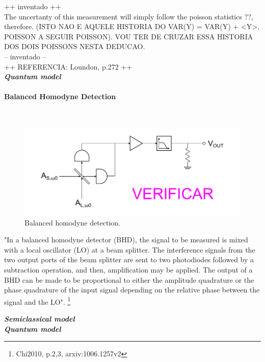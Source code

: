 \begin{bibunit}[plain]
++ inventado ++\\
The uncertanty of this measurement will simply follow the poisson statistics ??, therefore. (ISTO NAO E AQUELE HISTORIA DO VAR(Y) = VAR(Y) + <Y>, POISSON A SEGUIR POISSON). VOU TER DE CRUZAR ESSA HISTORIA DOS DOIS POISSONS NESTA DEDUCAO.\\
-- inventado --\\


++ REFERENCIA: Loundon, p.272 ++\\



{\bf \em Quantum model}\\


\paragraph{Balanced Homodyne Detection}\ \\
\begin{figure}[H]
	\centering
	\includegraphics{./sdf/optical_detection/figures/detection-balanced-homodyne.pdf}
	\caption{Balanced homodyne detection.}
\end{figure}
"In a balanced homodyne detector (BHD), the signal to be measured is mixed with a local oscillator (LO) at a beam splitter. The interference signals from the two output ports of the beam splitter are sent to two photodiodes followed by a subtraction operation, and then, amplification may be applied. The output of a BHD can be made to be proportional to either the amplitude quadrature or the phase quadrature of the input signal depending on the relative phase between the signal and the LO". \footnote{Chi2010, p.2,3, arxiv:1006.1257v2}



{\bf \em Semiclassical model}\\
{\bf \em Quantum model}\\


\end{bibunit}
